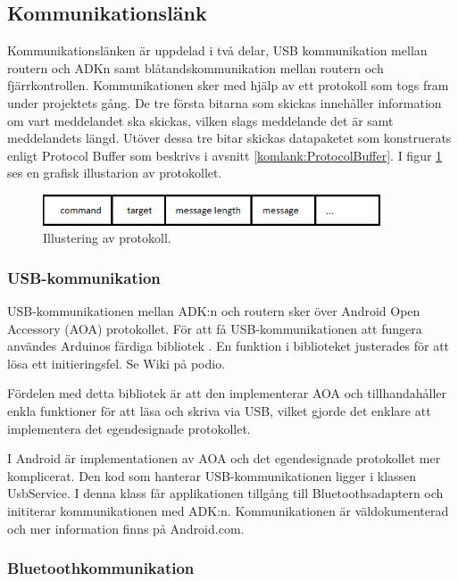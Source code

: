 \subsection{Kommunikationslänk}
Kommunikationslänken är uppdelad i två delar, USB kommunikation mellan routern och ADKn 
samt blåtandskommunikation mellan routern och fjärrkontrollen. Kommunikationen sker med hjälp av ett protokoll som 
togs fram under projektets gång. De tre första bitarna som skickas innehåller information om vart meddelandet ska skickas, 
vilken slags meddelande det är samt meddelandets längd. Utöver dessa tre bitar skickas datapaketet som konstruerats enligt 
Protocol Buffer som beskrivs i avsnitt \ref{komlank:ProtocolBuffer}. I figur \ref{fig:protocol} ses en grafisk illustarion av protokollet.


\begin{figure}[htbp!]
\centering
\includegraphics[width=10cm]{../../includes/figures/protocol.png}
\caption{Illustering av protokoll.}
\label{fig:protocol}
\end{figure}

\subsubsection{USB-kommunikation}
USB-kommunikationen mellan ADK:n och routern sker över Android Open Accessory (AOA) protokollet. 
För att få USB-kommunikationen att fungera användes Arduinos färdiga bibliotek
\cite{USBHost}. En funktion i biblioteket justerades för att lösa ett
initieringsfel. Se Wiki på podio.
 
Fördelen med detta bibliotek är att den implementerar AOA och tillhandahåller enkla funktioner för att läsa och skriva via USB, vilket 
gjorde det enklare att implementera det egendesignade protokollet.

I Android är implementationen av AOA och det egendesignade protokollet mer komplicerat. Den kod som hanterar USB-kommunikationen ligger 
i klassen UsbService. I denna klass får applikationen tillgång till
Bluetoothsadaptern och inititerar kommunikationen med ADK:n.
Kommunikationen är väldokumenterad och mer information finns på Android.com.
 
\subsubsection{Bluetoothkommunikation}

